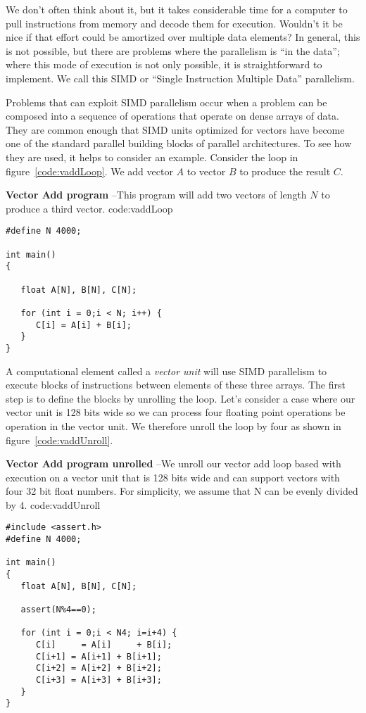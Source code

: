 We don't often think about it, but it takes considerable time for a computer to pull instructions from memory
and decode them for execution.  Wouldn't it be nice if that effort could be amortized over multiple data 
elements?   In general, this is not possible, but there are problems where the parallelism is ``in the data'';
where this mode of execution is not only possible, it is straightforward to implement.  We call this 
SIMD or ``Single Instruction Multiple Data'' parallelism.   

Problems that can exploit SIMD parallelism occur when a problem can be composed into a sequence of
operations that operate on dense arrays of data.   They are common enough that SIMD units optimized
for vectors have become one of the standard parallel building blocks of parallel architectures.  To see
how they are used, it helps to consider an example.  Consider the loop in figure~\ref{code:vaddLoop}.  
We add vector $A$ to vector $B$ to produce the result $C$.   


\begin{CodeExample}%
{\textbf{Vector Add program} --\small This program will add two vectors of length $N$
to produce a third vector.
}%
{code:vaddLoop}
\begin{lstlisting}
#define N 4000;

int main()
{

   float A[N], B[N], C[N];

   for (int i = 0;i < N; i++) {
      C[i] = A[i] + B[i];
   }
}	  
\end{lstlisting}
\end{CodeExample}


A computational element called a \emph{vector unit}
will use SIMD parallelism to execute blocks of instructions between elements of these three arrays. The 
first step is to define the blocks by unrolling the loop.  Let's consider a case where our vector unit is 128 bits
wide so we can process four floating point operations be operation in the vector unit.  We therefore 
unroll the loop by four as shown in figure~\ref{code:vaddUnroll}.  

\begin{CodeExample}%
{\textbf{Vector Add program unrolled} --\small We unroll our vector add loop based with execution 
on a vector unit that is 128 bits wide and can support vectors with four 32 bit float numbers.  For 
simplicity, we assume that N can be evenly divided by 4.
}%
{code:vaddUnroll}
\begin{lstlisting}
#include <assert.h>
#define N 4000;

int main()
{
   float A[N], B[N], C[N];
   
   assert(N%4==0);

   for (int i = 0;i < N4; i=i+4) {
      C[i]     = A[i]     + B[i];
      C[i+1] = A[i+1] + B[i+1];
      C[i+2] = A[i+2] + B[i+2];
      C[i+3] = A[i+3] + B[i+3];   
   }
}	  
\end{lstlisting}
\end{CodeExample}

